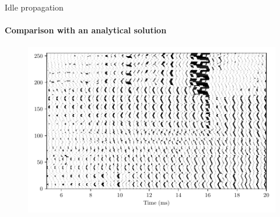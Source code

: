 \documentclass{beamer}
\begin{document}

\begin{frame}{Idle propagation}
    \framesubtitle{Comparison with an analytical solution}
    \begin{figure}
        \centering
        \includegraphics[width=0.8\linewidth]{Figures/idle_propagation_small.pdf}
    \end{figure}
\end{frame}

\end{document}
